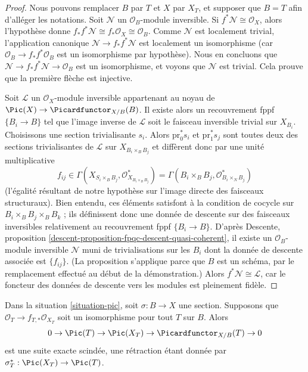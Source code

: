 \begin{proof}
Nous pouvons remplacer $B$ par $T$ et $X$ par $X_T$, et supposer que $B = T$
afin d'alléger les notations. Soit $\mathcal{N}$ un
$\mathcal{O}_B$-module inversible. Si $f^*\mathcal{N} \cong \mathcal{O}_X$, alors
l'hypothèse donne $f_*f^*\mathcal{N} \cong f_*\mathcal{O}_X \cong \mathcal{O}_B$.
Comme $\mathcal{N}$ est localement trivial, l'application canonique
$\mathcal{N} \to f_*f^*\mathcal{N}$ est localement un isomorphisme (car
$\mathcal{O}_B \to f_*f^*\mathcal{O}_B$ est un isomorphisme par hypothèse).
Nous en concluons que
$\mathcal{N} \to f_*f^*\mathcal{N} \to \mathcal{O}_B$ est un isomorphisme,
et voyons que $\mathcal{N}$ est trivial. Cela prouve que la première flèche
est injective.

\medskip\noindent
Soit $\mathcal{L}$ un $\mathcal{O}_X$-module inversible appartenant au
noyau de $\Pic(X) \to \Picardfunctor_{X/B}(B)$. Il existe alors un
recouvrement fppf $\{B_i \to B\}$ tel que l'image inverse de $\mathcal{L}$
soit le faisceau inversible trivial sur $X_{B_i}$. Choisissons une section
trivialisante $s_i$. Alors $\text{pr}_0^*s_i$ et $\text{pr}_1^*s_j$ sont toutes
deux des sections trivialisantes de $\mathcal{L}$ sur
$X_{B_i \times_B B_j}$ et diffèrent donc par une unité multiplicative
$$
f_{ij} \in
\Gamma(X_{S_i \times_B B_j}, \mathcal{O}_{X_{B_i \times_B B_j}}^*) =
\Gamma(B_i \times_B B_j, \mathcal{O}_{B_i \times_N B_j}^*)
$$
(l'égalité résultant de notre hypothèse sur l'image directe des faisceaux
structuraux). Bien entendu, ces éléments satisfont à la condition de cocycle
sur $B_i \times_B B_j \times_B B_k$ ; ils définissent donc une donnée de
descente sur des faisceaux inversibles relativement au recouvrement fppf
$\{B_i \to B\}$. D'après Descente, proposition
\ref{descent-proposition-fpqc-descent-quasi-coherent}, il existe un
$\mathcal{O}_B$-module inversible $\mathcal{N}$ muni de trivialisations sur les
$B_i$ dont la donnée de descente associée est $\{f_{ij}\}$. (La proposition
s'applique parce que $B$ est un schéma, par le remplacement effectué au début
de la démonstration.) Alors $f^*\mathcal{N} \cong \mathcal{L}$, car le
foncteur des données de descente vers les modules est pleinement fidèle.
\end{proof}

\begin{lemma}
\label{lemma-flat-geometrically-connected-fibres-with-section}
Dans la situation \ref{situation-pic}, soit $\sigma : B \to X$ une section.
Supposons que $\mathcal{O}_T \to f_{T, *}\mathcal{O}_{X_T}$ soit un isomorphisme
pour tout $T$ sur $B$. Alors
$$
0 \to \Pic(T) \to \Pic(X_T) \to \Picardfunctor_{X/B}(T) \to 0
$$
est une suite exacte scindée, une rétraction étant donnée par
$\sigma_T^* : \Pic(X_T) \to \Pic(T)$.
\end{lemma}

